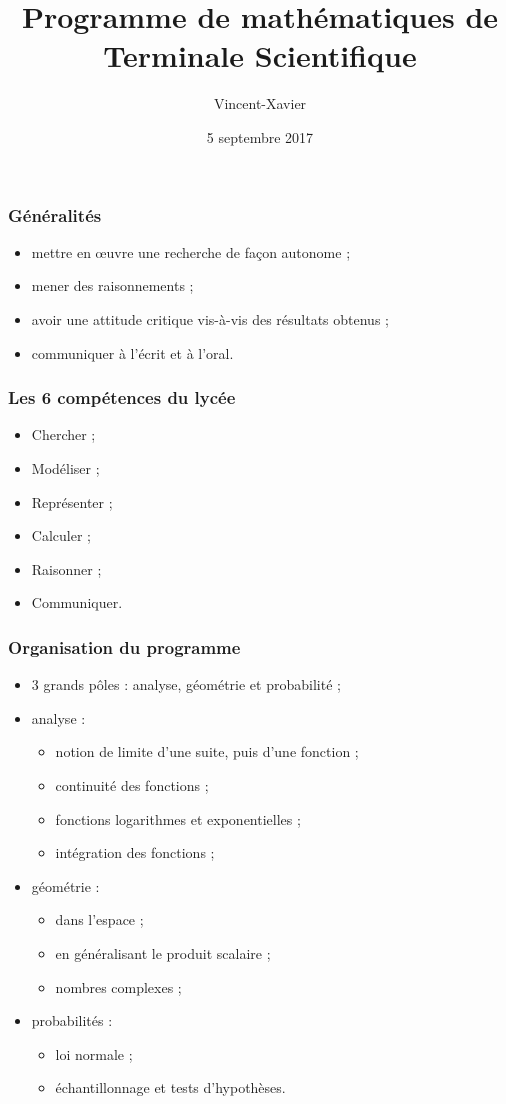 \documentclass[frenchb]{beamer}
\title{Programme de mathématiques de Terminale Scientifique}
\author{Vincent-Xavier \bsc{Jumel}}
\institute{LaSalle Saint-Denis}
\date{5 septembre 2017}
\begin{document}
\begin{frame}
  \maketitle
\end{frame}

\begin{frame}
  \frametitle{Généralités}
  \begin{itemize}
    \item mettre en œuvre une recherche de façon autonome ;
    \item mener des raisonnements ;
    \item avoir une attitude critique vis-à-vis des résultats obtenus ;
    \item communiquer à l'écrit et à l'oral.
  \end{itemize}
\end{frame}

\begin{frame}
  \frametitle{Les 6 compétences du lycée}
  \begin{itemize}[<+->]
    \item Chercher ;
    \item Modéliser ;
    \item Représenter ;
    \item Calculer ;
    \item Raisonner ;
    \item Communiquer.
  \end{itemize}
\end{frame}

\begin{frame}
  \frametitle{Organisation du programme}
  \begin{itemize}[<+->]
    \item 3 grands pôles : analyse, géométrie et probabilité ;
    \item analyse :
      \begin{itemize}
        \item notion de limite d'une suite, puis d'une fonction ;
        \item continuité des fonctions ;
        \item fonctions logarithmes et exponentielles ;
        \item intégration des fonctions ;
      \end{itemize}
    \item géométrie :
      \begin{itemize}
        \item dans l'espace ;
        \item en généralisant le produit scalaire ;
        \item nombres complexes ;
      \end{itemize}
    \item probabilités :
      \begin{itemize}
        \item loi normale ;
        \item échantillonnage et tests d'hypothèses.
      \end{itemize}
  \end{itemize}
\end{frame}
\end{document}
